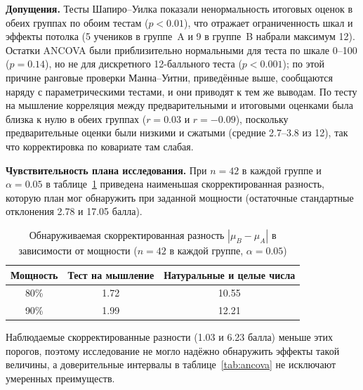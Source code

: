\documentclass[a4paper,14pt]{extreport}
\theoremstyle{plain}
\theoremstyle{definition}
\theoremstyle{remark}
\begin{document}
\textbf{Допущения.}
Тесты Шапиро--Уилка показали ненормальность итоговых оценок в обеих группах по обоим тестам ($p<0.01$), что отражает ограниченность шкал и эффекты потолка (5 учеников в группе~A и 9 в группе~B набрали максимум 12). Остатки ANCOVA были приблизительно нормальными для теста по шкале 0--100 ($p=0.14$), но не для дискретного 12-балльного теста ($p<0.001$); по этой причине ранговые проверки Манна--Уитни, приведённые выше, сообщаются наряду с параметрическими тестами, и они приводят к тем же выводам. По тесту на мышление корреляция между предварительными и итоговыми оценками была близка к нулю в обеих группах ($r=0.03$ и $r=-0.09$), поскольку предварительные оценки были низкими и сжатыми (средние 2.7--3.8 из 12), так что корректировка по ковариате там слабая.

\textbf{Чувствительность плана исследования.}
При $n=42$ в каждой группе и $\alpha=0.05$ в таблице~\ref{tab4} приведена наименьшая скорректированная разность, которую план мог обнаружить при заданной мощности (остаточные стандартные отклонения 2.78 и 17.05 балла).

\begin{table}[ht!]
	\centering
	\caption{Обнаруживаемая скорректированная разность $|\mu_B-\mu_A|$ в зависимости от мощности ($n=42$ в каждой группе, $\alpha=0.05$)}
	\label{tab4}
	\begin{tabular}{|c|c|c|}
		\hline
		\textbf{Мощность} & \textbf{Тест на мышление} & \textbf{Натуральные и целые числа} \\ \hline
		80\% & 1.72 & 10.55 \\
		90\% & 1.99 & 12.21 \\ \hline
	\end{tabular}
\end{table}

Наблюдаемые скорректированные разности (1.03 и 6.23 балла) меньше этих порогов, поэтому исследование не могло надёжно обнаружить эффекты такой величины, а доверительные интервалы в таблице~\ref{tab:ancova} не исключают умеренных преимуществ.
\end{document}
